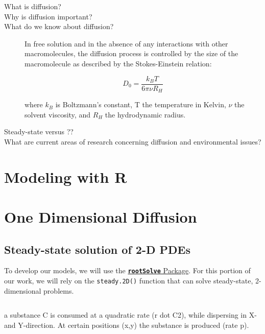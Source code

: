 \documentclass{tufte-handout}\usepackage[]{graphicx}\usepackage[]{color}
\begin{document}
\begin{description}
	\item[What is diffusion?]

	\item[Why is diffusion important?]
	
	\item[What do we know about diffusion?]
	
In free solution and in the absence of any interactions with other macromolecules, the diffusion process is controlled by the size of the macromolecule as described by the Stokes-Einstein relation:

\begin{equation}
D_0 =  \frac{k_B T}{6 \pi \nu R_H}
\end{equation}

where $k_B$ is Boltzmann's constant, T the temperature in Kelvin, $\nu$ the solvent viscosity, and $R_H$ the hydrodynamic radius.

  \item[Steady-state versus ??]
	\item[What are current areas of research concerning diffusion and environmental issues?]
\end{description}


\section{Modeling with R}

\section{One Dimensional Diffusion}


\subsection{Steady-state solution of 2-D PDEs}

To develop our models, we will use the \href{https://cran.r-project.org/web/packages/rootSolve/vignettes/rootSolve.pdf}{\texttt{\textbf{rootSolve}} Package}. For this portion of our work, we will rely on the \texttt{steady.2D()} function that can solve steady-state, 2-dimensional problems.

\begin{equation}
\end{equation}

a substance C is consumed at a quadratic rate (r dot C2), while dispersing in X- and Y-direction.
At certain positions (x,y) the substance is produced (rate p).
\end{document}
